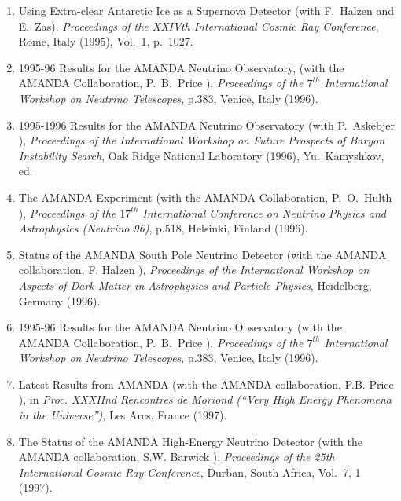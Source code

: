 \begin{enumerate}
\item    Using Extra-clear Antarctic Ice as a Supernova Detector 
         (with F.~Halzen and E.~Zas).
         {\it Proceedings of the 
         XXIVth International Cosmic Ray Conference},
         Rome, Italy (1995), Vol.~1, p.~1027.

\item    1995-96 Results for the AMANDA Neutrino Observatory, (with the AMANDA
         Collaboration, P.~B.~Price \etal),
         {\it Proceedings of the $7^{th}$ International Workshop on Neutrino 
         Telescopes}, p.383, Venice, Italy (1996).

\item    1995-1996 Results for the AMANDA Neutrino Observatory
         (with P.~Askebjer \etal), {\it Proceedings of the 
         International Workshop on Future Prospects of Baryon
         Instability Search}, Oak Ridge National Laboratory (1996),
         Yu.~Kamyshkov, ed.

\item    The AMANDA Experiment (with the AMANDA Collaboration, P.~O.~Hulth \etal),
         {\it Proceedings of the $17^{th}$ International Conference on Neutrino Physics
         and Astrophysics (Neutrino 96)}, p.518, Helsinki, Finland (1996).

\item    Status of the AMANDA South Pole Neutrino Detector (with the
         AMANDA collaboration, F. Halzen \etal),
         {\it Proceedings of the International Workshop on Aspects of
         Dark Matter in Astrophysics and Particle Physics},
         Heidelberg, Germany (1996).

\item    1995-96 Results for the AMANDA Neutrino Observatory (with the AMANDA
	 Collaboration, P.~B.~Price \etal),
         {\it Proceedings of the $7^{th}$ International Workshop on Neutrino Telescopes},
         p.383, Venice, Italy (1996).

\item    Latest Results from AMANDA (with 
         the AMANDA collaboration, P.B. Price \etal),
         in  {\it Proc. XXXIInd Rencontres de Moriond (``Very High Energy Phenomena
         in the Universe'')}, Les Arcs, France (1997).

\item   The Status of the AMANDA High-Energy Neutrino Detector (with 
        the AMANDA collaboration, S.W. Barwick \etal),
        {\it Proceedings of the 25th International Cosmic Ray Conference}, Durban,
        South Africa, Vol.~7, 1 (1997).


\end{enumerate}
